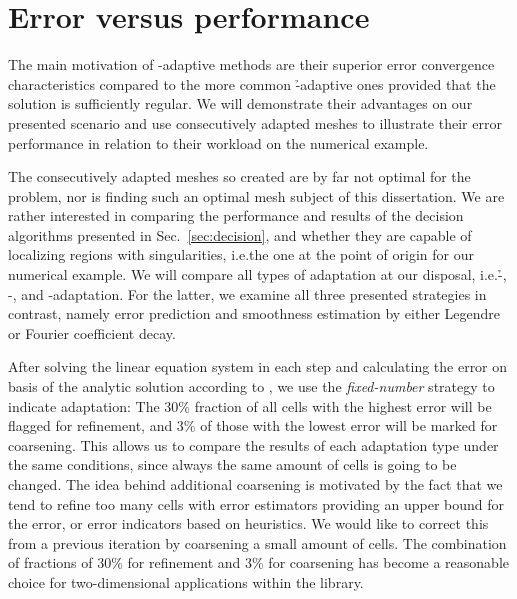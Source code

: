 \section{Error versus performance}
\label{sec:errorvsperformance}



The main motivation of \hp-adaptive methods are their superior error convergence characteristics compared to the more common \h-adaptive ones provided that the solution is sufficiently regular. We will demonstrate their advantages on our presented scenario and use consecutively adapted meshes to illustrate their error performance in relation to their workload on the numerical example.


The consecutively adapted meshes so created are by far not optimal for the problem, nor is finding such an optimal mesh subject of this dissertation. We are rather interested in comparing the performance and results of the decision algorithms presented in Sec.~\ref{sec:decision}, and whether they are capable of localizing regions with singularities, i.e.\@ the one at the point of origin for our numerical example. We will compare all types of adaptation at our disposal, i.e.\@ \h-, \p-, and \hp-adaptation. For the latter, we examine all three presented strategies in contrast, namely error prediction and smoothness estimation by either Legendre or Fourier coefficient decay.

After solving the linear equation system in each step and calculating the error on basis of the analytic solution according to \textcite{kelly1983}, we use the \textit{fixed-number} strategy to indicate adaptation: The 30\% fraction of all cells with the highest error will be flagged for refinement, and 3\% of those with the lowest error will be marked for coarsening. This allows us to compare the results of each adaptation type under the same conditions, since always the same amount of cells is going to be changed. The idea behind additional coarsening is motivated by the fact that we tend to refine too many cells with error estimators providing an upper bound for the error, or error indicators based on heuristics. We would like to correct this from a previous iteration by coarsening a small amount of cells. The combination of fractions of 30\% for refinement and 3\% for coarsening has become a reasonable choice for two-dimensional applications within the \dealii{} library.

